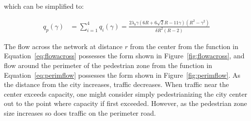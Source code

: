 \documentclass{article}
\begin{document}
\noindent which can be simplified to:

\begin{align}
	    q_p(\gamma) & = \sum\limits_{i=1}^4 q_i(\gamma) = \frac{2\lambda_b \gamma (6R + 6\sqrt{2}R - 11\gamma)(R^2 - \gamma^2)}{\delta R^2(R-2)}
    \label{eq:perimflow}
\end{align}


\noindent The flow across the network at distance $r$ from the center from the function in Equation~\eqref{eq:flowacross} possesses the form shown in Figure~\ref{fig:flowacross}, and flow around the perimeter of the pedestrian zone from the function in Equation~\eqref{eq:perimflow} possesses the form shown in Figure~\ref{fig:perimflow}. As the distance from the city increases, traffic decreases. When traffic near the center exceeds capacity, one might consider simply pedestrianizing the city center out to the point where capacity if first exceeded. However, as the pedestrian zone size increases so does traffic on the perimeter road. 
\end{document}
